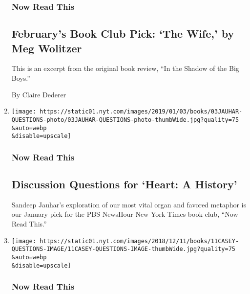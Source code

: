 \begin{enumerate}
  \hypertarget{now-read-this-4}{%
  \subsubsection{Now Read This}\label{now-read-this-4}}

  \hypertarget{februarys-book-club-pick-the-wife-by-meg-wolitzer}{%
  \subsection{February's Book Club Pick: `The Wife,' by Meg
  Wolitzer}\label{februarys-book-club-pick-the-wife-by-meg-wolitzer}}

  This is an excerpt from the original book review, ``In the Shadow of
  the Big Boys.''

  By Claire Dederer
\item
  \href{/2019/01/03/books/discussion-questions-heart-sandeep-jauhar.html}{}

  \texttt{[image: https://static01.nyt.com/images/2019/01/03/books/03JAUHAR-QUESTIONS-photo/03JAUHAR-QUESTIONS-photo-thumbWide.jpg?quality=75\\\&auto=webp\\\&disable=upscale]}

  \hypertarget{now-read-this-5}{%
  \subsubsection{Now Read This}\label{now-read-this-5}}

  \hypertarget{discussion-questions-for-heart-a-history}{%
  \subsection{Discussion Questions for `Heart: A
  History'}\label{discussion-questions-for-heart-a-history}}

  Sandeep Jauhar's exploration of our most vital organ and favored
  metaphor is our January pick for the PBS NewsHour-New York Times book
  club, ``Now Read This.''
\item
  \href{/2018/12/11/books/casey-gerald-there-will-be-no-miracles-here-now-read-this-questions.html}{}

  \texttt{[image: https://static01.nyt.com/images/2018/12/11/books/11CASEY-QUESTIONS-IMAGE/11CASEY-QUESTIONS-IMAGE-thumbWide.jpg?quality=75\\\&auto=webp\\\&disable=upscale]}

  \hypertarget{now-read-this-6}{%
  \subsubsection{Now Read This}\label{now-read-this-6}}


\end{enumerate}
